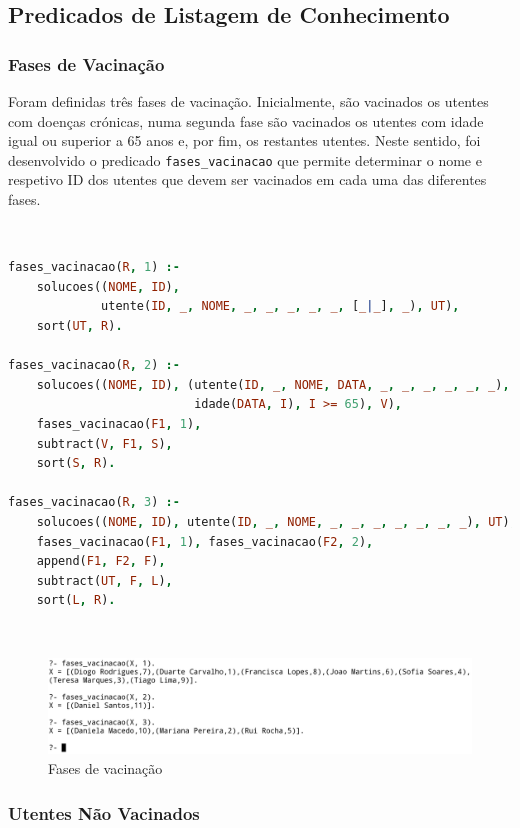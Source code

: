 \documentclass[a4paper, 11pt]{article}
\begin{document}
\subsection{Predicados de Listagem de Conhecimento}

\subsubsection{Fases de Vacinação}

Foram definidas três fases de vacinação. Inicialmente, são vacinados os utentes com doenças crónicas, numa segunda fase
são vacinados os utentes com idade igual ou superior a 65 anos e, por fim, os restantes utentes. Neste sentido, foi
desenvolvido o predicado \texttt{fases\_vacinacao} que permite determinar o nome e respetivo ID dos utentes que devem ser
vacinados em cada uma das diferentes fases.

\

\begin{lstlisting}[language=Prolog, caption={Extensão do predicado \texttt{fases\_vacinacao}}]
% Extensao do predicado fases_vacinacao: R, F -> {V, F}
fases_vacinacao(R, 1) :- 
    solucoes((NOME, ID),
             utente(ID, _, NOME, _, _, _, _, _, [_|_], _), UT),
    sort(UT, R).

fases_vacinacao(R, 2) :- 
    solucoes((NOME, ID), (utente(ID, _, NOME, DATA, _, _, _, _, _, _),
                          idade(DATA, I), I >= 65), V),
    fases_vacinacao(F1, 1),
    subtract(V, F1, S),
    sort(S, R).

fases_vacinacao(R, 3) :- 
    solucoes((NOME, ID), utente(ID, _, NOME, _, _, _, _, _, _, _), UT),
    fases_vacinacao(F1, 1), fases_vacinacao(F2, 2),
    append(F1, F2, F),
    subtract(UT, F, L),
    sort(L, R).
\end{lstlisting}

\

\begin{figure}[H]
    \centering
    \includegraphics[width=\textwidth]{img/fases_vacinacao.png}
    \caption{Fases de vacinação}
\end{figure}

\subsubsection{Utentes Não Vacinados}
\end{document}
